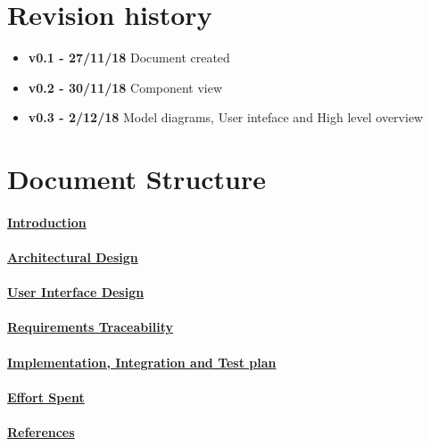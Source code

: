 \section{Revision history}
\begin{itemize}
\item \textbf{v0.1 - 27/11/18} Document created
\item \textbf{v0.2 - 30/11/18} Component view
\item \textbf{v0.3 - 2/12/18} Model diagrams, User inteface and High level overview
\end{itemize}
\section{Document Structure}
\paragraph{\hyperref[sect:introduction]{Introduction}}
\paragraph{\hyperref[sect:architecturalDesign]{Architectural Design}} 
\paragraph{\hyperref[sect:userInterfaceDesign]{User	 Interface Design}}
\paragraph{\hyperref[sect:requirementsTraceability]{Requirements Traceability}}
\paragraph{\hyperref[sect:implementationIntegrationTestplan]{Implementation, Integration and Test plan}}
\paragraph{\hyperref[sect:effort]{Effort Spent}}
\paragraph{\hyperref[sect:references]{References}} 


